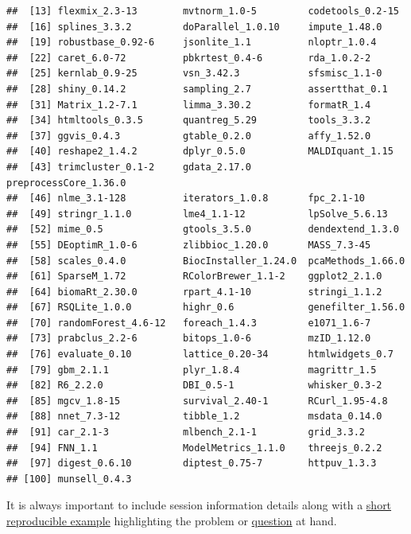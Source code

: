\begin{knitrout}
\begin{kframe}
\begin{verbatim}
##  [13] flexmix_2.3-13        mvtnorm_1.0-5         codetools_0.2-15     
##  [16] splines_3.3.2         doParallel_1.0.10     impute_1.48.0        
##  [19] robustbase_0.92-6     jsonlite_1.1          nloptr_1.0.4         
##  [22] caret_6.0-72          pbkrtest_0.4-6        rda_1.0.2-2          
##  [25] kernlab_0.9-25        vsn_3.42.3            sfsmisc_1.1-0        
##  [28] shiny_0.14.2          sampling_2.7          assertthat_0.1       
##  [31] Matrix_1.2-7.1        limma_3.30.2          formatR_1.4          
##  [34] htmltools_0.3.5       quantreg_5.29         tools_3.3.2          
##  [37] ggvis_0.4.3           gtable_0.2.0          affy_1.52.0          
##  [40] reshape2_1.4.2        dplyr_0.5.0           MALDIquant_1.15      
##  [43] trimcluster_0.1-2     gdata_2.17.0          preprocessCore_1.36.0
##  [46] nlme_3.1-128          iterators_1.0.8       fpc_2.1-10           
##  [49] stringr_1.1.0         lme4_1.1-12           lpSolve_5.6.13       
##  [52] mime_0.5              gtools_3.5.0          dendextend_1.3.0     
##  [55] DEoptimR_1.0-6        zlibbioc_1.20.0       MASS_7.3-45          
##  [58] scales_0.4.0          BiocInstaller_1.24.0  pcaMethods_1.66.0    
##  [61] SparseM_1.72          RColorBrewer_1.1-2    ggplot2_2.1.0        
##  [64] biomaRt_2.30.0        rpart_4.1-10          stringi_1.1.2        
##  [67] RSQLite_1.0.0         highr_0.6             genefilter_1.56.0    
##  [70] randomForest_4.6-12   foreach_1.4.3         e1071_1.6-7          
##  [73] prabclus_2.2-6        bitops_1.0-6          mzID_1.12.0          
##  [76] evaluate_0.10         lattice_0.20-34       htmlwidgets_0.7      
##  [79] gbm_2.1.1             plyr_1.8.4            magrittr_1.5         
##  [82] R6_2.2.0              DBI_0.5-1             whisker_0.3-2        
##  [85] mgcv_1.8-15           survival_2.40-1       RCurl_1.95-4.8       
##  [88] nnet_7.3-12           tibble_1.2            msdata_0.14.0        
##  [91] car_2.1-3             mlbench_2.1-1         grid_3.3.2           
##  [94] FNN_1.1               ModelMetrics_1.1.0    threejs_0.2.2        
##  [97] digest_0.6.10         diptest_0.75-7        httpuv_1.3.3         
## [100] munsell_0.4.3
\end{verbatim}
\end{kframe}
\end{knitrout}

It is always important to include session information details along
with a \href{http://adv-r.had.co.nz/Reproducibility.html}{short
  reproducible example} highlighting the problem or
\href{https://support.bioconductor.org/}{question} at hand. 

